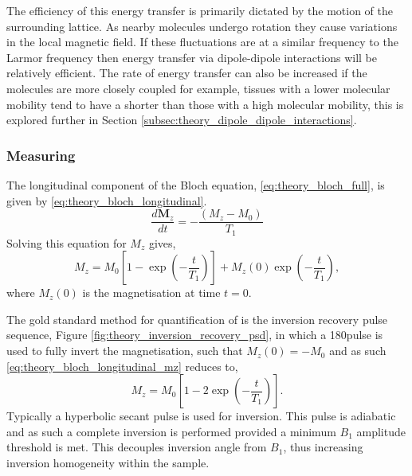 The efficiency of this energy transfer is primarily dictated by the motion of the surrounding lattice. As nearby molecules undergo rotation they cause variations in the local magnetic field. If these fluctuations are at a similar frequency to the Larmor frequency then energy transfer via dipole-dipole interactions will be relatively efficient. The rate of energy transfer can also be increased if the molecules are more closely coupled for example, tissues with a lower molecular mobility tend to have a shorter \tone than those with a high molecular mobility, this is explored further in Section \ref{subsec:theory_dipole_dipole_interactions}.

\subsubsection{Measuring \tone}
The longitudinal component of the Bloch equation, \eqref{eq:theory_bloch_full}, is given by \eqref{eq:theory_bloch_longitudinal}.
\begin{equation}
\frac{d\mathbf{M}_z}{dt} = - \frac{\left( M_z - M_0 \right)}{T_1}
\label{eq:theory_bloch_longitudinal}
\end{equation}
Solving this equation for $M_z$ gives,
\begin{equation}
M_z = M_0 \left[1 - \exp\left(-\frac{t}{T_1}\right) \right] + M_z\left( 0 \right) \exp \left(-\frac{t}{T_1}\right), 
\label{eq:theory_bloch_longitudinal_mz}
\end{equation}
where $M_z\left( 0 \right)$ is the magnetisation at time $t=0$.

The gold standard method for quantification of \tone is the inversion recovery pulse sequence, Figure \ref{fig:theory_inversion_recovery_psd}, in which a 180\degree{ }pulse is used to fully invert the magnetisation, such that $M_z(0) = -M_0$ and as such \eqref{eq:theory_bloch_longitudinal_mz} reduces to,
\begin{equation}
M_z = M_0 \left[1 - 2\exp\left(-\frac{t}{T_1}\right) \right].
\label{eq:theory_bloch_longitudinal_mz_inversion}
\end{equation}
Typically a hyperbolic secant pulse is used for inversion. This pulse is adiabatic and as such a complete inversion is performed provided a minimum $B_1$ amplitude threshold is met. This decouples inversion angle from $B_1$, thus increasing inversion homogeneity within the sample.

